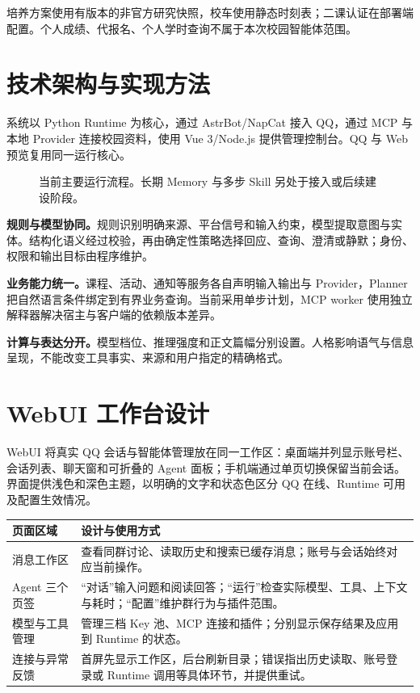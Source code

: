 \documentclass[lang=cn,chinesefont=nofont,11pt,a4paper,bibend=bibtex]{elegantpaper}
\begin{document}
培养方案使用有版本的非官方研究快照，校车使用静态时刻表；二课认证在部署端配置。个人成绩、代报名、个人学时查询不属于本次校园智能体范围。

\clearpage
\section{技术架构与实现方法}
系统以 Python Runtime 为核心，通过 AstrBot/NapCat 接入 QQ，通过 MCP 与本地 Provider 连接校园资料，使用 Vue 3/Node.js 提供管理控制台。QQ 与 Web 预览复用同一运行核心。

\begin{figure}[H]\centering
{}
\caption{当前主要运行流程。长期 Memory 与多步 Skill 另处于接入或后续建设阶段。}
\end{figure}

\textbf{规则与模型协同。}规则识别明确来源、平台信号和输入约束，模型提取意图与实体。结构化语义经过校验，再由确定性策略选择回应、查询、澄清或静默；身份、权限和输出目标由程序维护。

\textbf{业务能力统一。}课程、活动、通知等服务各自声明输入输出与 Provider，Planner 把自然语言条件绑定到有界业务查询。当前采用单步计划，MCP worker 使用独立解释器解决宿主与客户端的依赖版本差异。

\textbf{计算与表达分开。}模型档位、推理强度和正文篇幅分别设置。人格影响语气与信息呈现，不能改变工具事实、来源和用户指定的精确格式。

\clearpage
\section{WebUI 工作台设计}
WebUI 将真实 QQ 会话与智能体管理放在同一工作区：桌面端并列显示账号栏、会话列表、聊天窗和可折叠的 Agent 面板；手机端通过单页切换保留当前会话。界面提供浅色和深色主题，以明确的文字和状态色区分 QQ 在线、Runtime 可用及配置生效情况。

\begin{tabularx}{\textwidth}{@{}L{32mm}Y@{}}\toprule
页面区域 & 设计与使用方式\\\midrule
消息工作区 & 查看同群讨论、读取历史和搜索已缓存消息；账号与会话始终对应当前操作。\\
Agent 三个页签 & “对话”输入问题和阅读回答；“运行”检查实际模型、工具、上下文与耗时；“配置”维护群行为与插件范围。\\
模型与工具管理 & 管理三档 Key 池、MCP 连接和插件；分别显示保存结果及应用到 Runtime 的状态。\\
连接与异常反馈 & 首屏先显示工作区，后台刷新目录；错误指出历史读取、账号登录或 Runtime 调用等具体环节，并提供重试。\\\bottomrule
\end{tabularx}
\end{document}
